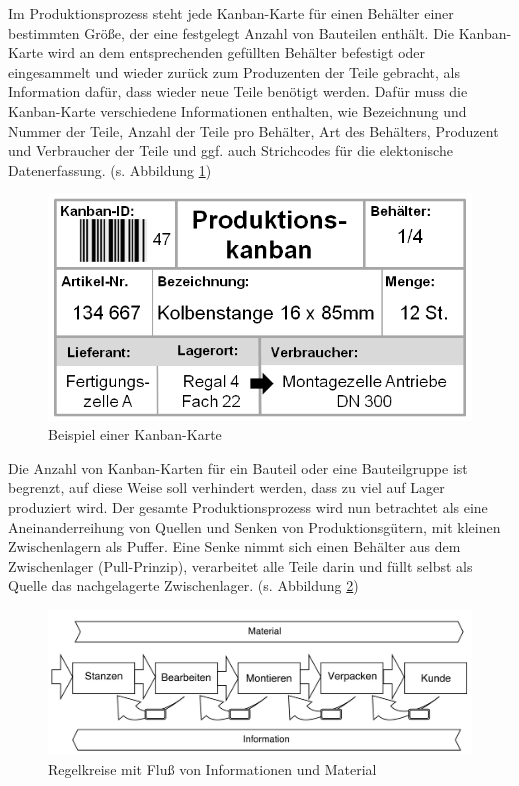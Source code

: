 Im Produktionsprozess steht jede Kanban-Karte für einen Behälter einer bestimmten Größe, der eine festgelegt Anzahl von Bauteilen enthält.
Die Kanban-Karte wird an dem entsprechenden gefüllten Behälter befestigt oder eingesammelt und wieder zurück zum 
Produzenten der Teile gebracht, als Information dafür, dass wieder neue Teile benötigt werden. 
Dafür muss die Kanban-Karte verschiedene Informationen enthalten, wie Bezeichnung und Nummer der Teile, 
Anzahl der Teile pro Behälter, Art des Behälters, Produzent und Verbraucher der Teile und ggf. auch Strichcodes für die elektonische Datenerfassung.
(s. Abbildung \ref{Kanbankarte})
\begin{figure}[h]
\centering
\includegraphics[width=.60\textwidth]{img/kanban-karte.png}
\caption[Beispiel einer Kanban-Karte]{Beispiel einer Kanban-Karte\footnotemark}
\label{Kanbankarte}
\end{figure}

Die Anzahl von Kanban-Karten für ein Bauteil oder eine Bauteilgruppe ist begrenzt, auf diese Weise soll verhindert werden, dass zu viel auf Lager produziert wird.
Der gesamte Produktionsprozess wird nun betrachtet als eine Aneinanderreihung von Quellen und Senken von Produktionsgütern, mit kleinen Zwischenlagern als Puffer.
Eine Senke nimmt sich einen Behälter aus dem Zwischenlager (Pull-Prinzip), verarbeitet alle Teile darin und füllt selbst als Quelle das nachgelagerte Zwischenlager.
(s. Abbildung \ref{flow})
\begin{figure}[h]
\centering
\includegraphics[width=.90\textwidth]{img/kanban-flow.png}
\caption[Regelkreise mit Fluß von Informationen und Material]{Regelkreise mit Fluß von Informationen und Material\footnotemark}
\label{flow}
\end{figure}

